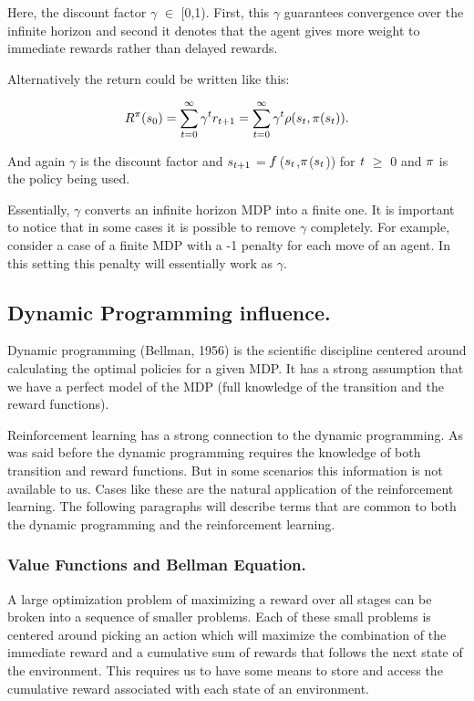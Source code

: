 Here, the discount factor $\gamma$ $\in$ [0,1). First, this $\gamma$ guarantees convergence over the infinite horizon and second it denotes that the agent gives more weight to immediate rewards rather than delayed rewards.

Alternatively the return could be written like this:

$$ \emph{$R^{\pi}$}(s_{0}) = \sum_{t=0}^{\infty}\emph{$\gamma^{t}r_{t+1}$} = \sum_{t=0}^{\infty}\emph{$\gamma^{t}\rho$}(\emph{$s_{t}$},\emph{$\pi$}(\emph{$s_{t}$})). $$

And again $\gamma$ is the discount factor and $\emph{$s_{t+1}$}$ = $\emph{f}$ ($\emph{$s_{t}$}$,$\emph{$\pi$}$($\emph{$s_{t}$}$)) for $\emph{t}$ $\geq$ 0 and $\emph{$\pi$}$ is the policy being used.

Essentially, $ \gamma $ converts an infinite horizon MDP into a finite one. It is important to notice that in some cases it is possible to remove $ \gamma $ completely. For example, consider a case of a finite MDP with a -1 penalty for each move of an agent. In this setting this penalty will essentially work as $\gamma$.

\subsection{Dynamic Programming influence.}

Dynamic programming (Bellman, 1956\nocite{bellman1956dynamic}) is the scientific discipline centered around calculating the optimal policies for a given MDP. It has a strong assumption that we have a perfect model of the MDP (full knowledge of the transition and the reward functions).

Reinforcement learning has a strong connection to the dynamic programming. As was said before the dynamic programming requires the knowledge of both transition and reward functions. But in some scenarios this information is not available to us. Cases like these are the natural application of the reinforcement learning. The following paragraphs will describe terms that are common to both the dynamic programming and the reinforcement learning.

\subsubsection{Value Functions and Bellman Equation.}

A large optimization problem of maximizing a reward over all stages can be broken into a sequence of smaller problems. Each of these small problems is centered around picking an action which will maximize the combination of the immediate reward and a cumulative sum of rewards that follows the next state of the environment. This requires us to have some means to store and access the cumulative reward associated with each state of an environment.

